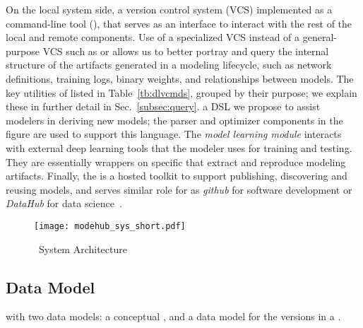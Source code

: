 \documentclass[conference]{IEEEtran}
\begin{document}
On the local system side, \DLV\is a version control system (VCS) implemented as a command-line tool
(\dlv), that serves as an interface to interact with the rest of the local and remote components. Use of a specialized
VCS instead of a general-purpose VCS such as  or  allows us to 
better portray and query the internal structure of the artifacts generated in a modeling lifecycle, such as network
definitions, training logs, binary weights, and relationships between models. The key utilities of
\dlv\are listed in Table~\ref{tb:dlvcmds}, grouped by their purpose; we explain these in further
detail in
Sec.~\ref{subsec:query}. \DQL\is a DSL we propose to assist modelers in deriving new models; the
\DQL\query parser and optimizer components in the figure are used to support this language. The
\emph{model learning module} %
interacts with external deep learning tools
that the modeler uses for training and testing. They are essentially wrappers on specific \dnn\systems that extract and reproduce modeling artifacts. 
Finally, the \modelhub\service is a hosted toolkit to support publishing,
discovering and reusing models, and serves similar role for \dnn\models as \emph{github} for software development or \emph{DataHub} for data science~\cite{datahub}. 




\begin{figure}[!t]
\centering
\texttt{[image: modehub\_sys\_short.pdf]}
\caption{\modelhub\ System Architecture}
\label{fig:sys_arch}
\end{figure}


\subsection{Data Model}
\label{subsec:datamodel}
\modelhub\works with two data models: %
a conceptual \dnn\model, and a data model for the versions in a \DLV\repository.
\end{document}
